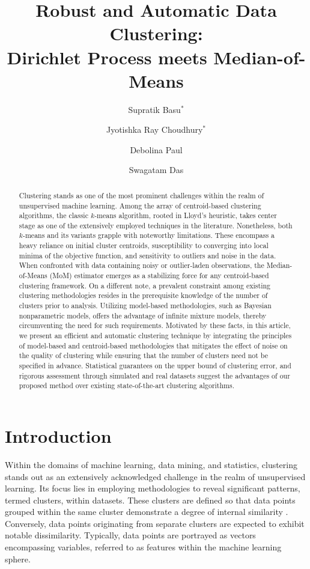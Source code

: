 \documentclass[11pt]{article}
\title{\textbf{Robust and Automatic Data Clustering:\\ Dirichlet Process meets Median-of-Means}}
\author[1]{Supratik Basu$^*$}
\author[1]{Jyotishka Ray Choudhury$^*$}
\author[2]{Debolina Paul}
\author[3]{Swagatam Das}
\affil[1]{Indian Statistical Institute, Kolkata}
\affil[2]{Department of Statistics, Stanford University}
\affil[3]{Electronics and Communication Sciences Unit, Indian Statistical Institute, Kolkata}
\date{\vspace{-5ex}}
\begin{document}
\maketitle
\def\thefootnote{*}\def\thefootnote{\arabic{footnote}}

\begin{abstract}
Clustering stands as one of the most prominent challenges within the realm of unsupervised machine learning. Among the array of centroid-based clustering algorithms, the classic $k$-means algorithm, rooted in Lloyd's heuristic, takes center stage as one of the extensively employed techniques in the literature. Nonetheless, both $k$-means and its variants grapple with noteworthy limitations. These encompass a heavy reliance on initial cluster centroids, susceptibility to converging into local minima of the objective function, and sensitivity to outliers and noise in the data. When confronted with data containing noisy or outlier-laden observations, the Median-of-Means (MoM) estimator emerges as a stabilizing force for any centroid-based clustering framework. On a different note, a prevalent constraint among existing clustering methodologies resides in the prerequisite knowledge of the number of clusters prior to analysis. Utilizing model-based methodologies, such as Bayesian nonparametric models, offers the advantage of infinite mixture models, thereby circumventing the need for such requirements. Motivated by these facts, in this article, we present an efficient and automatic clustering technique by integrating the principles of model-based and centroid-based methodologies that mitigates the effect of noise on the quality of clustering while ensuring that the number of clusters need not be specified in advance. Statistical guarantees on the upper bound of clustering error, and rigorous assessment through simulated and real datasets suggest the advantages of our proposed method over existing state-of-the-art clustering algorithms.
\end{abstract}


\section{Introduction}
\label{sec:intro}

Within the domains of machine learning, data mining, and statistics, clustering stands out as an extensively acknowledged challenge in the realm of unsupervised learning. Its focus lies in employing methodologies to reveal significant patterns, termed clusters, within datasets. These clusters are defined so that data points grouped within the same cluster demonstrate a degree of internal similarity \citep{Xu2015}. Conversely, data points originating from separate clusters are expected to exhibit notable dissimilarity. Typically, data points are portrayed as vectors encompassing variables, referred to as features within the machine learning sphere.
\end{document}
